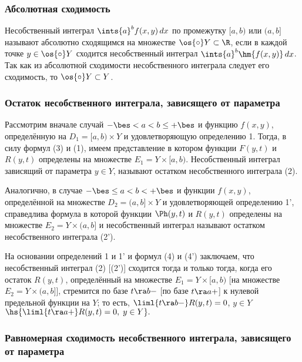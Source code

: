 \documentclass[a4paper]{article}
\begin{document}
\subsubsection{Абсолютная сходимость}

Несобственный интеграл $\ints{a}^b f(x,y)\,dx$ по промежутку $[a,b)$
или $(a,b]$ называют абсолютно сходящимся на множестве $\os{\circ}Y
\subset\R$, если в каждой точке $y\in\os{\circ}Y$ сходится
несобственный интеграл $\ints{a}^b \hm{f(x,y)}\,dx$. Так как из
абсолютной сходимости несобственного интеграла следует его
сходимость, то $\os{\circ}Y\subset Y$.

\subsubsection{Остаток несобственного интеграла, зависящего от
параметра}

Рассмотрим вначале случай $-\bes<a<b\le+\bes$ и функцию $f(x,y)$,
определённую на $D_1=[a,b)\times Y$ и удовлетворяющую определению 1.
Тогда, в силу формул (3) и (1), имеем представление  в котором функции $F(y,t)$ и $R(y,t)$
определены на множестве $E_1=Y\times[a,b)$. Несобственный интеграл
зависящий от параметра $y\in Y$, называют остатком несобственного
интеграла (2).

Аналогично, в случае $-\bes\le a < b < +\bes$ и функции $f(x,y)$,
определённой на множестве $D_2 = (a,b]\times Y$ и удовлетворяющей
определению 1', справедлива формула  в которой функции $\Ph(y,t)$ и $R(y,t)$ определены
на множестве $E_2=Y\times(a,b]$ и несобственный интеграл
 называют
остатком несобственного интеграла (2').

На основании определений 1 и 1' и формул (4) и (4') заключаем, что
несобственный интеграл (2) [(2')] сходится тогда и только тогда,
когда его остаток $R(y,t)$, определённый на множестве
$E_1=Y\times[a,b)$ [на множестве $E_2=Y\times(a,b]$], стремится по
базе $t\ra b-$ [по базе $t\ra a+$] к нулевой предельной функции на
$Y$; то есть, $\liml{t\ra b-} R(y,t)=0$, $y\in Y$ $\hs{\liml{t\ra
a+} R(y,t)=0, \; y\in Y}.$

\subsubsection{Равномерная сходимость несобственного интеграла,
зависящего от параметра}
\end{document}
